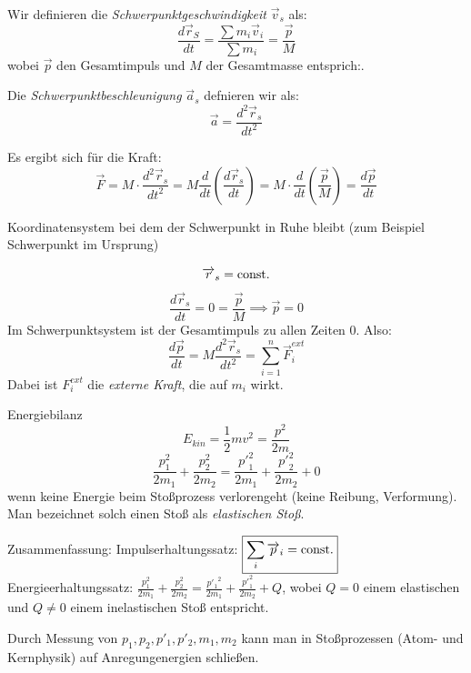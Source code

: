 \documentclass[a4paper,10pt]{scrartcl}
\begin{document}
\begin{df}[Schwerpunktgeschwindigkeit]
 Wir definieren die \emph{Schwerpunktgeschwindigkeit} $\vec v_s$ als:
\[
 \frac{d\vec r_S}{dt}=\frac{\sum m_i \vec v_i}{\sum m_i} = \frac{\vec p}{M}
\]
wobei $\vec p$ den Gesamtimpuls und $M$ der Gesamtmasse entsprich:.
\end{df}
\begin{df}[Schwerpunktbeschleunigung]
 Die \emph{Schwerpunktbeschleunigung} $\vec a_s$ defnieren wir als:
\[
 \vec a=\frac{d^2\vec r_s}{dt^2}
\]
\end{df}
Es ergibt sich für die Kraft:
\[
 \vec F=M\cdot \frac{d^2 \vec r_s}{dt^2}=M\frac{d}{dt}(\frac{d\vec r_s}{dt})=M\cdot \frac{d}{dt} (\frac{\vec p}{M})=\frac{d\vec p}{dt}
\]
\begin{df}
 Koordinatensystem bei dem der Schwerpunkt in Ruhe bleibt (zum Beispiel Schwerpunkt im Ursprung)
\end{df}
\[\overrightarrow{r}_s=\text{const}.\]
\[
 \frac{d\vec r_s}{dt}=0=\frac{\vec p}{M}\implies \vec p=0
\]
Im Schwerpunktsystem ist der Gesamtimpuls zu allen Zeiten 0. Also:
\[
 \frac{d\vec p}{dt}=M\frac{d^2\vec r_s}{dt^2}=\sum_{i=1}^n \vec F_i^{ext}
\]
Dabei ist $F_i^{ext}$ die \emph{externe Kraft}, die auf $m_i$ wirkt.
\begin{seg}{Energiebilanz}
 \[
  E_{kin}=\frac{1}{2} m v^2=\frac{p^2}{2m}
 \]
\[
  \frac{p_1^2}{2m_1}+\frac{p_2^2}{2m_2}=\frac{{p'}_1^2}{2m_1}+\frac{{p'}_2^2}{2m_2}+0
 \]
 wenn keine Energie beim Stoßprozess verlorengeht (keine Reibung, Verformung). Man bezeichnet solch einen Stoß als \emph{elastischen Stoß}.

\end{seg}
\begin{seg}{Zusammenfassung:}
 Impulserhaltungssatz: $\boxed{\sum_i \overrightarrow{p}_i=\text{const}.}$\\
 Energieerhaltungssatz: $\boxed{\frac{ p_1^2}{2m_1} + \frac{p_2^2}{2m_2} = \frac{{p'_1}^2}{2m_1}+\frac{{p'}_1^2 }{2m_2}+Q}$,
wobei $Q=0$ einem elastischen und $Q\neq 0$ einem inelastischen Stoß entspricht. 
\end{seg}
Durch Messung von $p_1, p_2, p'_1, p'_2, m_1, m_2$ kann man in Stoßprozessen (Atom- und Kernphysik) auf Anregungenergien schließen.
\end{document}
